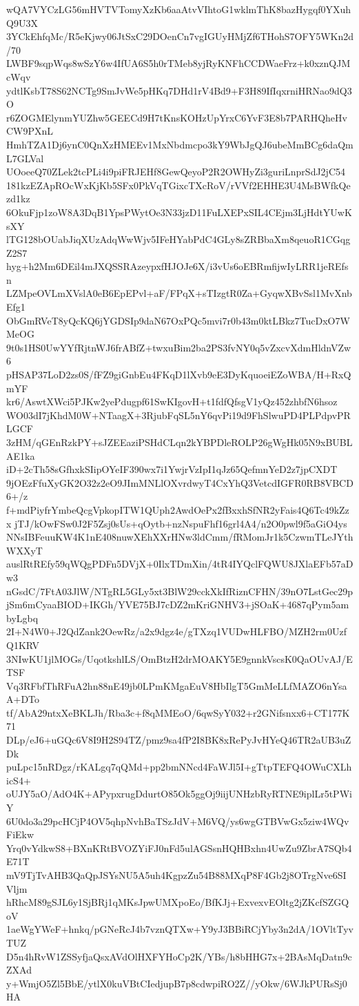 wQA7VYCzLG56mHVTVTomyXzKb6aaAtvVIhtoG1wklmThK8bazHygqf0YXuhQ9U3X
3YCkEhfqMc/R5eKjwy06JtSxC29DOenCn7vgIGUyHMjZf6THohS7OFY5WKn2d/70
LWBF9sqpWqs8wSzY6w4IfUA6S5h0rTMeb8yjRyKNFhCCDWaeFrz+k0xznQJMcWqv
ydtlKsbT78S62NCTg9SmJvWe5pHKq7DHd1rV4Bd9+F3H89IfIqxrniHRNao9dQ3O
r6ZOGMElynmYUZhw5GEECd9H7tKnsKOHzUpYrxC6YvF3E8b7PARHQheHvCW9PXnL
HmhTZA1Dj6ynC0QnXzHMEEv1MxNbdmcpo3kY9WbJgQJ6ubeMmBCg6daQmL7GLVal
UOoeeQ70ZLek2tcPLi4i9piFRJEHf8GewQeyoP2R2OWHyZi3guriLnprSdJ2jC54
181kzEZApROcWxKjKb5SFx0PkVqTGixcTXcRoV/rVVf2EHHE3U4MsBWfkQezd1kz
6OkuFjp1zoW8A3DqB1YpsPWytOe3N33jzD11FuLXEPxSIL4CEjm3LjHdtYUwKsXY
lTG128bOUabJiqXUzAdqWwWjv5IFeHYabPdC4GLy8sZRBbaXm8qeuoR1CGqgZ2S7
hyg+h2Mm6DEil4mJXQSSRAzeypxfHJOJe6X/i3vUs6oEBRmfijwIyLRR1jeREfsn
LZMpeOVLmXVslA0eB6EpEPvl+aF/FPqX+sTIzgtR0Za+GyqwXBvSsl1MvXnbEfg1
ObGmRVeT8yQcKQ6jYGDSIp9daN67OxPQc5mvi7r0b43m0ktLBkz7TucDxO7WMeOG
9t0s1HS0UwYYfRjtnWJ6frABfZ+twxuBim2ba2PS3fvNY0q5vZxcvXdmHldnVZw6
pHSAP37LoD2zs0S/fFZ9giGnbEu4FKqD1lXvb9eE3DyKquoeiEZoWBA/H+RxQmYF
kr6/AswtXWci5PJKw2yePdugpf61SwKIgovH+t1fdfQfsgV1yQz452zhbfN6hsoz
WO03dI7jKhdM0W+NTaagX+3RjubFqSL5nY6qvPi19d9FhSlwuPD4PLPdpvPRLGCF
3zHM/qGEnRzkPY+sJZEEaziPSHdCLqn2kYBPDleROLP26gWgHk05N9xBUBLAE1ka
iD+2cTh58sGfhxkSIipOYeIF390wx7i1YwjrVzIpI1qJz65QefmnYeD2z7jpCXDT
9jOEzFfuXyGK2O32z2eO9JImMNLlOXvrdwyT4CxYhQ3VetcdIGFR0RB8VBCD6+/z
f+mdPiyfrYmbeQcgVpkopITW1QUph2AwdOePx2fBxxhSfNR2yFais4Q6Tc49kZzx
jTJ/kOwFSw0J2F5Zsj0sUs+qOytb+nzNspuFhf16grl4A4/n2O0pwl9f5aGiO4ys
NNsIBFeuuKW4K1nE408nuwXEhXXrHNw3ldCmm/fRMomJr1k5CzwmTLeJYthWXXyT
auslRtREfy59qWQgPDFn5DVjX+0IlxTDmXin/4tR4IYQclFQWU8JXlaEFb57aDw3
nGsdC/7FtA03JlW/NTgRL5GLy5xt3BlW29cckXkIfRiznCFHN/39nO7LstGec29p
jSm6mCyaaBIOD+IKGh/YVE75BJ7cDZ2mKriGNHV3+jSOaK+4687qPym5ambyLgbq
2I+N4W0+J2QdZank2OewRz/a2x9dgz4e/gTXzq1VUDwHLFBO/MZH2rm0UzfQ1KRV
3NIwKU1jlMOGs/UqotkshlLS/OmBtzH2drMOAKY5E9gnnkVscsK0QaOUvAJ/ETSF
Vq3RFbfThRFuA2hn88nE49jb0LPmKMgaEuV8HbIlgT5GmMeLLfMAZO6nYsaA+DTo
tf/AbA29ntxXeBKLJh/Rba3c+f8qMMEoO/6qwSyY032+r2GNifsnxx6+CT177K71
DLp/eJ6+uGQc6V8I9H2S94TZ/pmz9sa4fP2I8BK8xRePyJvHYeQ46TR2aUB3uZDk
puLpc15nRDgz/rKALgq7qQMd+pp2bmNNcd4FaWJl5I+gTtpTEFQ4OWuCXLhicS4+
oUJY5aO/AdO4K+APypxrugDdurtO85Ok5ggOj9iijUNHzbRyRTNE9iplLr5tPWiY
6U0do3a29pcHCjP4OV5qhpNvhBaTSzJdV+M6VQ/ys6wgGTBVwGx5ziw4WQvFiEkw
Yrq0vYdkwS8+BXnKRtBVOZYiFJ0nFd5ulAGSsnHQHBxhn4UwZu9ZbrA7SQb4E71T
mV9TjTvAHB3QaQpJSYsNU5A5uh4KgpzZu54B88MXqP8F4Gb2j8OTrgNve6SIVljm
hRhcM89gSJL6y1SjBRj1qMKsJpwUMXpoEo/BfKJj+ExvexvEOltg2jZKcfSZGQoV
1aeWgYWeF+hnkq/pGNeRcJ4b7vznQTXw+Y9yJ3BBiRCjYby3n2dA/1OVltTyvTUZ
D5n4hRvW1ZSSyfjaQsxAVdOlHXFYHoCp2K/YBs/h8bHHG7x+2BAsMqDatn9cZXAd
y+WmjO5Zl5BbE/ytlX0kuVBtCIedjupB7p8cdwpiRO2Z//yOkw/6WJkPURsSj0HA
